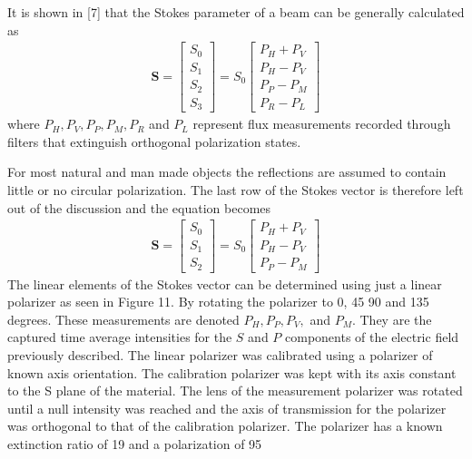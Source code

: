 It is shown in [7] that the Stokes parameter of a beam can be generally calculated as
%
\begin{align}
    \mathbf{S} =
    \begin{bmatrix}
        S_0 \\
        S_1 \\
        S_2 \\
        S_3
    \end{bmatrix}
    =
    S_0
    \begin{bmatrix}
        P_H + P_V \\
        P_H - P_V \\
        P_P - P_M \\
        P_R - P_L
    \end{bmatrix}
\end{align}
%
where $P_H, P_V, P_P, P_M, P_R$ and $P_L$ represent flux measurements recorded through filters that extinguish orthogonal polarization states.

For most natural and man made objects the reflections are assumed to contain little or no circular polarization. The last row of the Stokes vector is therefore left out of the discussion and the equation becomes
%
\begin{align}
    \mathbf{S} =
    \begin{bmatrix}
        S_0 \\
        S_1 \\
        S_2
    \end{bmatrix}
    =
    S_0
    \begin{bmatrix}
        P_H + P_V \\
        P_H - P_V \\
        P_P - P_M
    \end{bmatrix}
\end{align}
%
The linear elements of the Stokes vector can be determined using just a linear polarizer as seen in Figure 11.  By rotating the polarizer to 0, 45 90 and 135 degrees.  These measurements are denoted $P_H, P_P, P_V,$ and $P_M$. They are the captured time average intensities for the $S$ and $P$ components of the electric field previously described.
%
%
The linear polarizer was calibrated using a polarizer of known axis orientation.  The calibration polarizer was kept with its axis constant to the S plane of the material.  The lens of the measurement polarizer was rotated until a null intensity was reached and the axis of transmission for the polarizer was orthogonal to that of the calibration polarizer.  The polarizer has a known extinction ratio of 19 and a polarization of 95%

